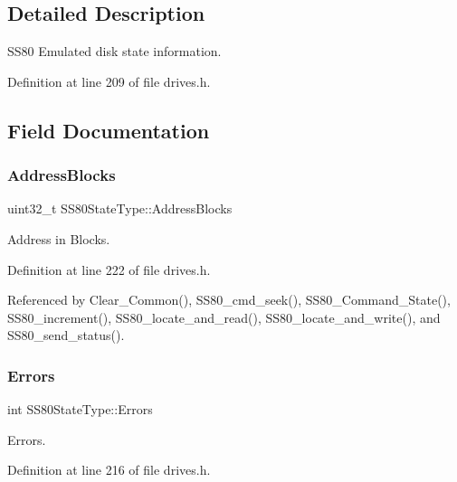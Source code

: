 \subsection{Detailed Description}
S\+S80 Emulated disk state information. 

Definition at line 209 of file drives.\+h.



\subsection{Field Documentation}
\mbox{\label{structSS80StateType_a6cffa1e36a57bce4188ede4bd9dbd7ad}} 
\subsubsection{\texorpdfstring{Address\+Blocks}{AddressBlocks}}
{\footnotesize\ttfamily uint32\+\_\+t S\+S80\+State\+Type\+::\+Address\+Blocks}



Address in Blocks. 



Definition at line 222 of file drives.\+h.



Referenced by Clear\+\_\+\+Common(), S\+S80\+\_\+cmd\+\_\+seek(), S\+S80\+\_\+\+Command\+\_\+\+State(), S\+S80\+\_\+increment(), S\+S80\+\_\+locate\+\_\+and\+\_\+read(), S\+S80\+\_\+locate\+\_\+and\+\_\+write(), and S\+S80\+\_\+send\+\_\+status().

\mbox{\label{structSS80StateType_a7a5c363c6f617ee457a4daacadb3a7b2}} 
\subsubsection{\texorpdfstring{Errors}{Errors}}
{\footnotesize\ttfamily int S\+S80\+State\+Type\+::\+Errors}



Errors. 



Definition at line 216 of file drives.\+h.



